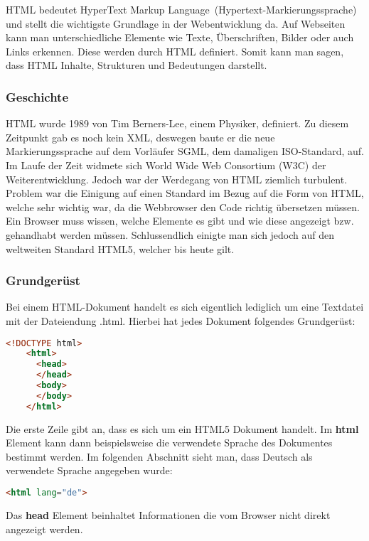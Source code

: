 HTML bedeutet HyperText Markup Language (Hypertext-Markierungssprache) und stellt die wichtigste Grundlage in der Webentwicklung da. Auf Webseiten kann man unterschiedliche Elemente wie Texte, Überschriften, Bilder oder auch Links erkennen. Diese werden durch HTML definiert. Somit kann man sagen, dass HTML Inhalte, Strukturen und Bedeutungen darstellt.
\cite{frontend_web_html}

\subsubsection{Geschichte}
HTML wurde 1989 von Tim Berners-Lee, einem Physiker, definiert. Zu diesem Zeitpunkt gab es noch kein XML, deswegen baute er die neue Markierungssprache auf dem Vorläufer SGML, dem damaligen ISO-Standard, auf. Im Laufe der Zeit widmete sich World Wide Web Consortium (W3C) der Weiterentwicklung.
Jedoch war der Werdegang von HTML ziemlich turbulent. Problem war die Einigung auf einen Standard im Bezug auf die Form von HTML, welche sehr wichtig war, da die Webbrowser den Code richtig übersetzen müssen. Ein Browser muss wissen, welche Elemente es gibt und wie diese angezeigt bzw. gehandhabt werden müssen. Schlussendlich einigte man sich jedoch auf den weltweiten Standard HTML5, welcher bis heute gilt.
\cite{frontend_web_html}

\subsubsection{Grundgerüst}
Bei einem HTML-Dokument handelt es sich eigentlich lediglich um eine Textdatei mit der Dateiendung .html.
Hierbei hat jedes Dokument folgendes Grundgerüst:

\begin{lstlisting}[language=html, caption=Grundgerüst HTML]
    <!DOCTYPE html>
    <html>
      <head>
      </head>
      <body>
      </body>
    </html>
\end{lstlisting}

Die erste Zeile gibt an, dass es sich um ein HTML5 Dokument handelt. Im \textbf{html} Element kann dann beispielsweise die verwendete Sprache des Dokumentes bestimmt werden.
Im folgenden Abschnitt sieht man, dass Deutsch als verwendete Sprache angegeben wurde:

\begin{lstlisting}[language=html]
    <html lang="de">
\end{lstlisting}

Das \textbf{head} Element beinhaltet Informationen die vom Browser nicht direkt angezeigt werden. 


